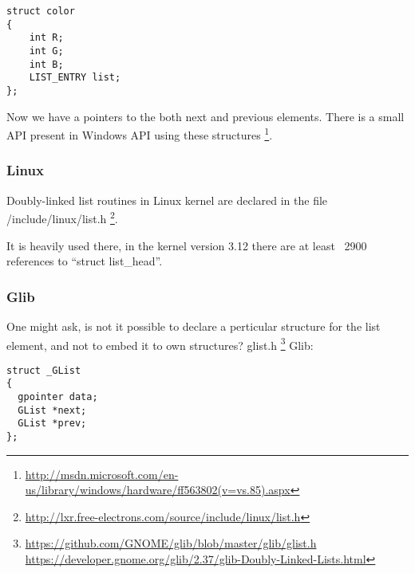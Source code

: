 \begin{lstlisting}
struct color
{
	int R;
	int G;
	int B;
	LIST_ENTRY list;
};
\end{lstlisting}

{Now we have a pointers to the both next and previous elements}.
{There is a small API present in Windows API using these structures}
\footnote{\url{http://msdn.microsoft.com/en-us/library/windows/hardware/ff563802(v=vs.85).aspx}}.

\subsubsection{Linux}

{Doubly-linked list routines in Linux kernel are declared in the file} /include/linux/list.h
\footnote{\url{http://lxr.free-electrons.com/source/include/linux/list.h}}.

{It is heavily used there, in the kernel version 3.12 there are at least ~2900 references to} 
``struct list\_head''.

\subsubsection{Glib}

{One might ask, is not it possible to declare a perticular structure for the list element,
and not to embed it to own structures}?
 glist.h
\footnote{\url{https://github.com/GNOME/glib/blob/master/glib/glist.h} 
\url{https://developer.gnome.org/glib/2.37/glib-Doubly-Linked-Lists.html}} \InENRU Glib:

\begin{lstlisting}
struct _GList
{
  gpointer data;
  GList *next;
  GList *prev;
};
\end{lstlisting}

